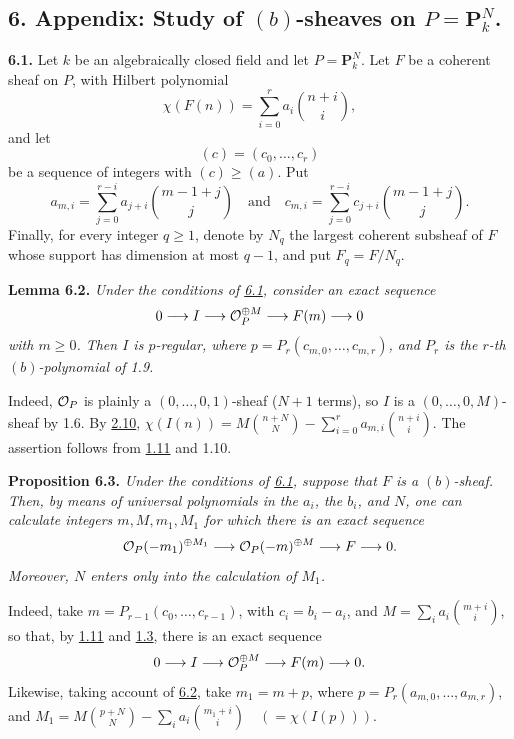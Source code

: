 
\subsection*{6. Appendix: Study of $(b)$-sheaves on $P=\mathbf P^N_k$.}

\textbf{6.1.} Let $k$ be an algebraically closed field and let $P=\mathbf P^N_k$. Let $F$ be a coherent sheaf on $P$, with Hilbert polynomial
\[
  \chi(F(n))=\sum_{i=0}^{r}a_i\binom{n+i}{i},
\]
and let
\[
  (c)=(c_0,\ldots,c_r)
\]
be a sequence of integers with $(c)\geq(a)$. Put
\[
  a_{m,i}=\sum_{j=0}^{r-i}a_{j+i}\binom{m-1+j}{j}
  \quad\text{and}\quad
  c_{m,i}=\sum_{j=0}^{r-i}c_{j+i}\binom{m-1+j}{j}.
\]
Finally, for every integer $q\geq1$, denote by $N_q$ the largest coherent subsheaf of $F$ whose support has dimension at most $q-1$, and put $F_q=F/N_q$.

\textbf{Lemma 6.2.} \emph{Under the conditions of \hyperlink{sga6.e13.para.6-1}{6.1}, consider an exact sequence
\[
  0\longrightarrow I\longrightarrow\mathcal O_P^{\oplus M}
  \longrightarrow F(m)\longrightarrow0
\]
with $m\geq0$. Then $I$ is $p$-regular, where
\(p=P_r(c_{m,0},\ldots,c_{m,r})\), and $P_r$ is the $r$-th
$(b)$-polynomial of 1.9.}

Indeed, $\mathcal O_P$ is plainly a $(0,\ldots,0,1)$-sheaf ($N+1$ terms), so
$I$ is a $(0,\ldots,0,M)$-sheaf by 1.6. By \hyperlink{sga6.e13.rem.2-10}{2.10},
\(\chi(I(n))=M\binom{n+N}{N}
-\sum_{i=0}^{r}a_{m,i}\binom{n+i}{i}\). The assertion follows from
\hyperlink{sga6.e13.thm.1-11}{1.11} and 1.10.

\textbf{Proposition 6.3.} \emph{Under the conditions of \hyperlink{sga6.e13.para.6-1}{6.1}, suppose that $F$ is a $(b)$-sheaf. Then, by means of universal polynomials in the $a_i$, the $b_i$, and $N$, one can calculate integers $m,M,m_1,M_1$ for which there is an exact sequence
\[
  \mathcal O_P(-m_1)^{\oplus M_1}\longrightarrow
  \mathcal O_P(-m)^{\oplus M}\longrightarrow F\longrightarrow0.
\]
Moreover, $N$ enters only into the calculation of $M_1$.}

Indeed, take $m=P_{r-1}(c_0,\ldots,c_{r-1})$, with $c_i=b_i-a_i$,
and $M=\sum_i a_i\binom{m+i}{i}$, so that, by \hyperlink{sga6.e13.thm.1-11}{1.11} and \hyperlink{sga6.e13.prop.1-3}{1.3}, there is
an exact sequence
\[
  0\longrightarrow I\longrightarrow\mathcal O_P^{\oplus M}
  \longrightarrow F(m)\longrightarrow0.
\]
Likewise, taking account of \hyperlink{sga6.e13.lem.6-2}{6.2}, take $m_1=m+p$, where
$p=P_r(a_{m,0},\ldots,a_{m,r})$, and
$M_1=M\binom{p+N}{N}-\sum_i a_i\binom{m_1+i}{i}
\quad(=\chi(I(p)))$.

